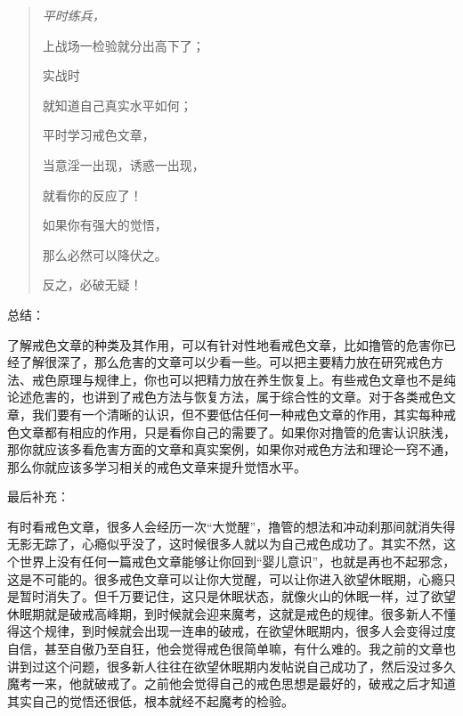 \begin{multicols}{2}
    \begin{quotation}\it
        平时练兵，

        上战场一检验就分出高下了；

        实战时

        就知道自己真实水平如何；

        平时学习戒色文章，

        当意淫一出现，诱惑一出现，

        就看你的反应了！

        如果你有强大的觉悟，

        那么必然可以降伏之。

        反之，必破无疑！
    \end{quotation}
\end{multicols}

总结：

了解戒色文章的种类及其作用，可以有针对性地看戒色文章，比如撸管的危害你已经了解很深了，那么危害的文章可以少看一些。可以把主要精力放在研究戒色方法、戒色原理与规律上，你也可以把精力放在养生恢复上。有些戒色文章也不是纯论述危害的，也讲到了戒色方法与恢复方法，属于综合性的文章。对于各类戒色文章，我们要有一个清晰的认识，但不要低估任何一种戒色文章的作用，其实每种戒色文章都有相应的作用，只是看你自己的需要了。如果你对撸管的危害认识肤浅，那你就应该多看危害方面的文章和真实案例，如果你对戒色方法和理论一窍不通，那么你就应该多学习相关的戒色文章来提升觉悟水平。


最后补充：

有时看戒色文章，很多人会经历一次“大觉醒”，撸管的想法和冲动刹那间就消失得无影无踪了，心瘾似乎没了，这时候很多人就以为自己戒色成功了。其实不然，这个世界上没有任何一篇戒色文章能够让你回到“婴儿意识”，也就是再也不起邪念，这是不可能的。很多戒色文章可以让你大觉醒，可以让你进入欲望休眠期，心瘾只是暂时消失了。但千万要记住，这只是休眠状态，就像火山的休眠一样，过了欲望休眠期就是破戒高峰期，到时候就会迎来魔考，这就是戒色的规律。很多新人不懂得这个规律，到时候就会出现一连串的破戒，在欲望休眠期内，很多人会变得过度自信，甚至自傲乃至自狂，他会觉得戒色很简单嘛，有什么难的。我之前的文章也讲到过这个问题，很多新人往往在欲望休眠期内发帖说自己成功了，然后没过多久魔考一来，他就破戒了。之前他会觉得自己的戒色思想是最好的，破戒之后才知道其实自己的觉悟还很低，根本就经不起魔考的检验。

